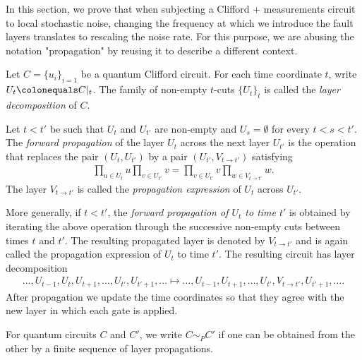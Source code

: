 \documentclass[manuscript,screen,review]{acmart}
\begin{document}
In this section, we prove that when subjecting a Clifford + measurements circuit to local stochastic noise, changing the frequency at which we introduce the fault layers translates to rescaling the noise rate. For this purpose, we are abusing the notation "propagation" by reusing it to describe a different context.
\begin{definition}
  Let $C = \{u_{i}\}_{i=1}$ be a quantum Clifford circuit. For each time coordinate $t$, write $U_{t}\colonequals C|_{t}$. The family of non-empty $t$-cuts $\{U_{t}\}_{t}$ is called the \textit{layer decomposition} of $C$.

  Let $t<t'$ be such that $U_t$ and $U_{t'}$ are non-empty and $U_s=\emptyset$ for every $t<s<t'$. The \textit{forward propagation} of the layer $U_{t}$ across the next layer $U_{t'}$ is the operation that replaces the pair $(U_{t},U_{t'})$ by a pair $(U_{t'},V_{t\to t'})$ satisfying
  \begin{equation*}
    \begin{split}
      \prod_{u\in U_{t}}u\prod_{v\in U_{t'}}v
      =
      \prod_{v\in U_{t'}}v\prod_{w\in V_{t\to t'}}w.
    \end{split}
  \end{equation*}
  The layer $V_{t\to t'}$ is called the \textit{propagation expression} of $U_{t}$ across $U_{t'}$.

  More generally, if $t<t'$, the \textit{forward propagation of $U_t$ to time $t'$} is obtained by iterating the above operation through the successive non-empty cuts between times $t$ and $t'$. The resulting propagated layer is denoted by $V_{t\to t'}$ and is again called the propagation expression of $U_t$ to time $t'$. The resulting circuit has layer decomposition
  \begin{equation*}
    \begin{split}
      \ldots,U_{t-1},U_t,U_{t+1},\ldots,U_{t'},U_{t'+1},\ldots
      \mapsto
      \ldots,U_{t-1},U_{t+1},\ldots,U_{t'},V_{t\to t'},U_{t'+1},\ldots.
    \end{split}
  \end{equation*}
  After propagation we update the time coordinates so that they agree with the new layer in which each gate is applied.
\end{definition}


\begin{definition}[$C\sim_{P}C'$]
  For quantum circuits $C$ and $C'$, we write $C\sim_{P}C'$ if one can be obtained from the other by a finite sequence of layer propagations.
\end{definition}
\end{document}
